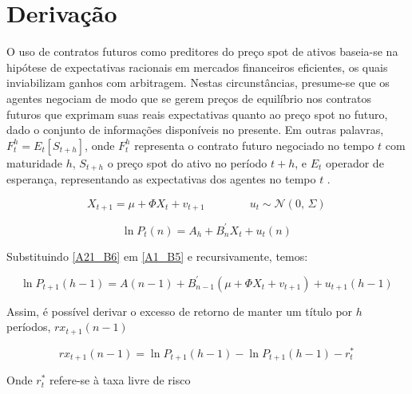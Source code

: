 \documentclass[12pt]{article}
\begin{document}
 

\section{Derivação}
\label{sub_sect}



O uso de contratos futuros como preditores do preço spot de ativos baseia-se na hipótese de expectativas racionais em mercados financeiros eficientes, os quais inviabilizam ganhos com arbitragem. Nestas circunstâncias, presume-se que os agentes negociam de modo que se gerem preços de equilíbrio nos contratos futuros que exprimam suas reais expectativas quanto ao preço spot no futuro, dado o conjunto de informações disponíveis no presente. Em outras palavras, $ F^h_t = E_t [S_{t+h}]$, onde $F^h_t$ representa o contrato futuro negociado no tempo $t$ com maturidade $h$, $S_{t+h}$ o preço spot do ativo no período $t+h$, e $E_t$ operador de esperança, representando as expectativas dos agentes no tempo $t$   . 



\begin{equation} \label{A1_B5} %
X_{t+1}  =  \mu + \Phi X_{t} + v_{t+1} \qquad \qquad  u_{t} \sim \mathcal{N}(0,\,\Sigma)\,
\end{equation}

\begin{equation} \label{A21_B6} %
\ln P_t(n)  =  A_h + B^{\prime}_n X_t + u_t(n) \,
\end{equation}

Substituindo \ref{A21_B6} em \ref{A1_B5} e recursivamente, temos: %

\begin{equation} %
\ln P_{t+1}(h-1)  =  A(n-1) + B^{\prime}_{n-1} (\mu + \Phi X_t + v_{t+1}) + u_{t+1}(h-1) \,
\end{equation}

Assim, é possível derivar o excesso de retorno de manter um título por $h$ períodos, $rx_{t+1}(n-1)$ 

\begin{equation} %
rx_{t+1}(n-1)  =  \ln P_{t+1}(h-1) - \ln P_{t+1}(h-1) - r^*_t \,
\end{equation}

Onde $r^*_t$ refere-se à taxa livre de risco %
\end{document}
